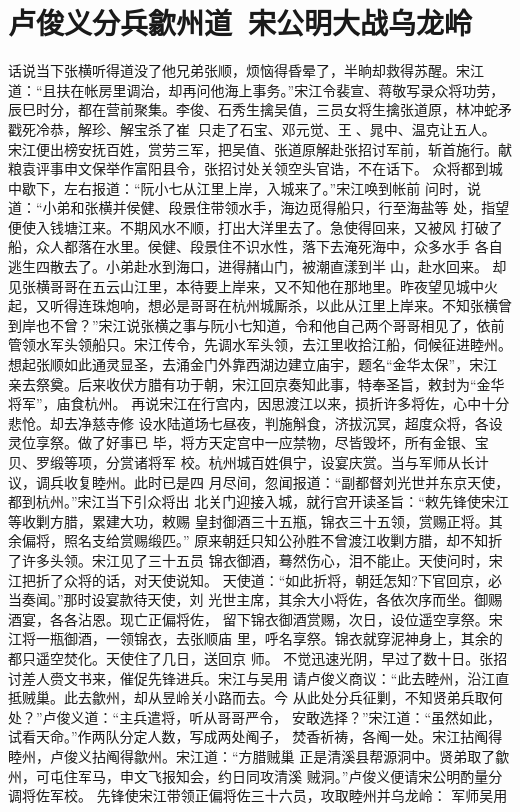 \chapter{卢俊义分兵歙州道~宋公明大战乌龙岭}

话说当下张横听得道没了他兄弟张顺，烦恼得昏晕了，半晌却救得苏醒。宋江
道：“且扶在帐房里调治，却再问他海上事务。”宋江令裴宣、蒋敬写录众将功劳，
辰巳时分，都在营前聚集。李俊、石秀生擒吴值，三员女将生擒张道原，林冲蛇矛
戳死冷恭，解珍、解宝杀了崔，只走了石宝、邓元觉、王、晁中、温克让五人。
宋江便出榜安抚百姓，赏劳三军，把吴值、张道原解赴张招讨军前，斩首施行。献
粮袁评事申文保举作富阳县令，张招讨处关领空头官诰，不在话下。
众将都到城中歇下，左右报道：“阮小七从江里上岸，入城来了。”宋江唤到帐前
问时，说道：“小弟和张横并侯健、段景住带领水手，海边觅得船只，行至海盐等
处，指望便使入钱塘江来。不期风水不顺，打出大洋里去了。急使得回来，又被风
打破了船，众人都落在水里。侯健、段景住不识水性，落下去淹死海中，众多水手
各自逃生四散去了。小弟赴水到海口，进得赭山门，被潮直漾到半山，赴水回来。
却见张横哥哥在五云山江里，本待要上岸来，又不知他在那地里。昨夜望见城中火
起，又听得连珠炮响，想必是哥哥在杭州城厮杀，以此从江里上岸来。不知张横曾
到岸也不曾？”宋江说张横之事与阮小七知道，令和他自己两个哥哥相见了，依前
管领水军头领船只。宋江传令，先调水军头领，去江里收拾江船，伺候征进睦州。
想起张顺如此通灵显圣，去涌金门外靠西湖边建立庙宇，题名“金华太保”，宋江
亲去祭奠。后来收伏方腊有功于朝，宋江回京奏知此事，特奉圣旨，敕封为“金华
将军”，庙食杭州。
再说宋江在行宫内，因思渡江以来，损折许多将佐，心中十分悲怆。却去净慈寺修
设水陆道场七昼夜，判施斛食，济拔沉冥，超度众将，各设灵位享祭。做了好事已
毕，将方天定宫中一应禁物，尽皆毁坏，所有金银、宝贝、罗缎等项，分赏诸将军
校。杭州城百姓俱宁，设宴庆赏。当与军师从长计议，调兵收复睦州。此时已是四
月尽间，忽闻报道：“副都督刘光世并东京天使，都到杭州。”宋江当下引众将出
北关门迎接入城，就行宫开读圣旨：“敕先锋使宋江等收剿方腊，累建大功，敕赐
皇封御酒三十五瓶，锦衣三十五领，赏赐正将。其余偏将，照名支给赏赐缎匹。”
原来朝廷只知公孙胜不曾渡江收剿方腊，却不知折了许多头领。宋江见了三十五员
锦衣御酒，蓦然伤心，泪不能止。天使问时，宋江把折了众将的话，对天使说知。
天使道：“如此折将，朝廷怎知?下官回京，必当奏闻。”那时设宴款待天使，刘
光世主席，其余大小将佐，各依次序而坐。御赐酒宴，各各沾恩。现亡正偏将佐，
留下锦衣御酒赏赐，次日，设位遥空享祭。宋江将一瓶御酒，一领锦衣，去张顺庙
里，呼名享祭。锦衣就穿泥神身上，其余的都只遥空焚化。天使住了几日，送回京
师。
不觉迅速光阴，早过了数十日。张招讨差人赍文书来，催促先锋进兵。宋江与吴用
请卢俊义商议：“此去睦州，沿江直抵贼巢。此去歙州，却从昱岭关小路而去。今
从此处分兵征剿，不知贤弟兵取何处？”卢俊义道：“主兵遣将，听从哥哥严令，
安敢选择？”宋江道：“虽然如此，试看天命。”作两队分定人数，写成两处阄子，
焚香祈祷，各阄一处。宋江拈阄得睦州，卢俊义拈阄得歙州。宋江道：“方腊贼巢
正是清溪县帮源洞中。贤弟取了歙州，可屯住军马，申文飞报知会，约日同攻清溪
贼洞。”卢俊义便请宋公明酌量分调将佐军校。
先锋使宋江带领正偏将佐三十六员，攻取睦州并乌龙岭：
军师吴用

